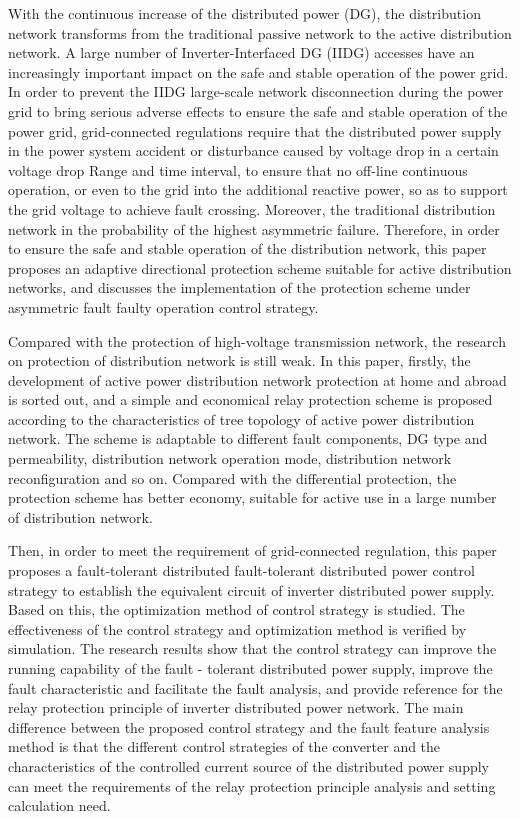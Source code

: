 \begin{englishabstract}

With the continuous increase of the distributed power (DG), the distribution network transforms from the traditional passive network to the active distribution network. A large number of Inverter-Interfaced DG (IIDG) accesses have an increasingly important impact on the safe and stable operation of the power grid. In order to prevent the IIDG large-scale network disconnection during the power grid to bring serious adverse effects to ensure the safe and stable operation of the power grid, grid-connected regulations require that the distributed power supply in the power system accident or disturbance caused by voltage drop in a certain voltage drop Range and time interval, to ensure that no off-line continuous operation, or even to the grid into the additional reactive power, so as to support the grid voltage to achieve fault crossing. Moreover, the traditional distribution network in the probability of the highest asymmetric failure. Therefore, in order to ensure the safe and stable operation of the distribution network, this paper proposes an adaptive directional protection scheme suitable for active distribution networks, and discusses the implementation of the protection scheme under asymmetric fault faulty operation control strategy.

Compared with the protection of high-voltage transmission network, the research on protection of distribution network is still weak. In this paper, firstly, the development of active power distribution network protection at home and abroad is sorted out, and a simple and economical relay protection scheme is proposed according to the characteristics of tree topology of active power distribution network. The scheme is adaptable to different fault components, DG type and permeability, distribution network operation mode, distribution network reconfiguration and so on. Compared with the differential protection, the protection scheme has better economy, suitable for active use in a large number of distribution network.

Then, in order to meet the requirement of grid-connected regulation, this paper proposes a fault-tolerant distributed fault-tolerant distributed power control strategy to establish the equivalent circuit of inverter distributed power supply. Based on this, the optimization method of control strategy is studied. The effectiveness of the control strategy and optimization method is verified by simulation. The research results show that the control strategy can improve the running capability of the fault - tolerant distributed power supply, improve the fault characteristic and facilitate the fault analysis, and provide reference for the relay protection principle of inverter distributed power network. The main difference between the proposed control strategy and the fault feature analysis method is that the different control strategies of the converter and the characteristics of the controlled current source of the distributed power supply can meet the requirements of the relay protection principle analysis and setting calculation need.


\end{englishabstract}

